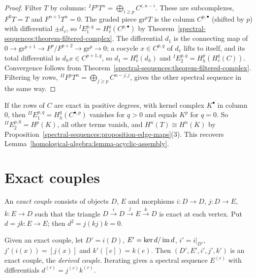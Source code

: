 \begin{proof}
Filter $T$ by columns: ${}^IF^pT^n = \bigoplus_{i \geq p}C^{i, n-i}$. These are subcomplexes, $F^0T = T$ and $F^{n+1}T^n = 0$. The graded
piece $\mathrm{gr}^pT$ is the column $C^{p,\bullet}$ (shifted by $p$) with differential $\pm d_v$, so
${}^IE_1^{p,q} = H^q_v(C^{p,\bullet})$ by Theorem~\ref{spectral-sequences:theorem-filtered-complex}. The differential $d_1$ is the
connecting map of $0 \to \mathrm{gr}^{p+1} \to F^p/F^{p+2} \to \mathrm{gr}^p \to 0$; a cocycle $x \in C^{p,q}$ of $d_v$ lifts to itself, and its total
differential is $d_hx \in C^{p+1,q}$, so $d_1 = H^q_v(d_h)$ and ${}^IE_2^{p,q} = H^p_h(H^q_v(C))$. Convergence follows from
Theorem~\ref{spectral-sequences:theorem-filtered-complex}. Filtering by rows, ${}^{II}F^pT^n = \bigoplus_{j \geq p}C^{n-j, j}$, gives the other
spectral sequence in the same way.
\end{proof}

\begin{example}\label{spectral-sequences:example-acyclic-assembly}
If the rows of $C$ are exact in positive degrees, with kernel complex $K^\bullet$ in column $0$, then ${}^{II}E_1^{p,q} = H^q_h(C^{\bullet,p})$
vanishes for $q > 0$ and equals $K^p$ for $q = 0$. So ${}^{II}E_2^{p,0} = H^p(K)$, all other terms vanish, and
$H^n(T) \cong H^n(K)$ by Proposition~\ref{spectral-sequences:proposition-edge-maps}(3). This recovers
Lemma~\ref{homological-algebra:lemma-acyclic-assembly}.
\end{example}

\section{Exact couples}\label{spectral-sequences:section-exact-couples}

\begin{definition}\label{spectral-sequences:definition-exact-couple}
An \emph{exact couple} consists of objects $D$, $E$ and morphisms $i \colon D \to D$, $j \colon D \to E$, $k \colon E \to D$ such that the triangle
$D \xrightarrow{i} D \xrightarrow{j} E \xrightarrow{k} D$ is exact at each vertex. Put $d = jk \colon E \to E$; then $d^2 = j(kj)k = 0$.
\end{definition}

\begin{proposition}\label{spectral-sequences:proposition-derived-couple}
Given an exact couple, let $D' = i(D)$, $E' = \ker d/\operatorname{im} d$, $i' = i|_{D'}$, $j'(i(x)) = [j(x)]$ and $k'([e]) = k(e)$. Then $(D', E', i', j', k')$
is an exact couple, the \emph{derived couple}. Iterating gives a spectral sequence $E^{(r)}$ with differentials $d^{(r)} = j^{(r)}k^{(r)}$.
\end{proposition}

